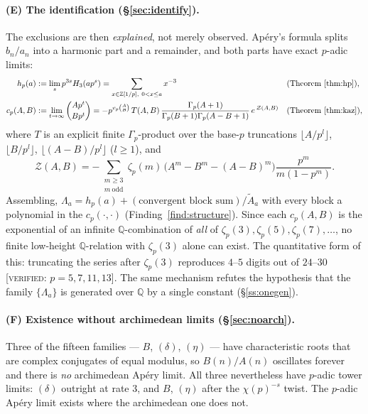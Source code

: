 \documentclass[11pt,reqno]{article}
\newcommand{\QQ}{\mathbb{Q}}
\newcommand{\ZZ}{\mathbb{Z}}
\newcommand{\Gp}{\Gamma_p}
\newcommand{\Atil}{\widetilde{A}}
\newcommand{\vp}{v_p}
\newcommand{\bin}[2]{\binom{#1}{#2}}
\newcommand{\floor}[1]{\lfloor #1 \rfloor}
\newcommand{\VER}[1]{{\normalfont\textsc{[verified:} #1\textsc{]}}}
\theoremstyle{plain}
\theoremstyle{definition}
\theoremstyle{remark}
\numberwithin{equation}{section}
\begin{document}
\paragraph{(E) The identification (\S\ref{sec:identify}).}
The exclusions are then \emph{explained}, not merely observed.  Ap\'ery's
formula splits $b_n/a_n$ into a harmonic part and a remainder, and both parts
have exact $p$-adic limits:
\begin{align*}
  h_p(a)&:=\lim_s p^{3s}H_3(ap^s)
        =\sum_{x\in\ZZ[1/p],\ 0<x\le a}x^{-3} &&\text{(Theorem~\ref{thm:hp})},\\
  c_p(A,B)&:=\lim_{t\to\infty}\bin{Ap^t}{Bp^t}
        =-p^{\vp\binom{A}{B}}\,T(A,B)\,
          \frac{\Gp(A+1)}{\Gp(B+1)\Gp(A-B+1)}\,
          e^{\,\mathcal{Z}(A,B)} &&\text{(Theorem~\ref{thm:kaz})},
\end{align*}
where $T$ is an explicit finite $\Gp$-product over the base-$p$ truncations
$\floor{A/p^l}$, $\floor{B/p^l}$, $\floor{(A-B)/p^l}$ ($l\ge1$), and
\[
  \mathcal{Z}(A,B)=-\sum_{\substack{m\ge3\\ m\ \mathrm{odd}}}
    \zeta_p(m)\,\bigl(A^m-B^m-(A-B)^m\bigr)\frac{p^m}{m(1-p^m)} .
\]
Assembling, $\Lambda_a=h_p(a)+(\text{convergent block sum})/\Atil_a$ with every
block a polynomial in the $c_p(\cdot,\cdot)$ (Finding~\ref{find:structure}).
Since each $c_p(A,B)$ is the exponential of an infinite $\QQ$-combination of
\emph{all} of $\zeta_p(3),\zeta_p(5),\zeta_p(7),\dots$, no finite low-height
$\QQ$-relation with $\zeta_p(3)$ alone can exist.  The quantitative form of
this: truncating the series after $\zeta_p(3)$ reproduces $4$--$5$ digits out of
$24$--$30$ \VER{$p=5,7,11,13$}.  The same mechanism refutes the hypothesis that
the family $\{\Lambda_a\}$ is generated over $\QQ$ by a single constant
(\S\ref{ss:onegen}).

\paragraph{(F) Existence without archimedean limits (\S\ref{sec:noarch}).}
Three of the fifteen families --- $B$, $(\delta)$, $(\eta)$ --- have
characteristic roots that are complex conjugates of equal modulus, so
$B(n)/A(n)$ oscillates forever and there is \emph{no} archimedean Ap\'ery
limit.  All three nevertheless have $p$-adic tower limits: $(\delta)$ outright
at rate $3$, and $B$, $(\eta)$ after the $\chi(p)^{-s}$ twist.  The $p$-adic
Ap\'ery limit exists where the archimedean one does not.
\end{document}
